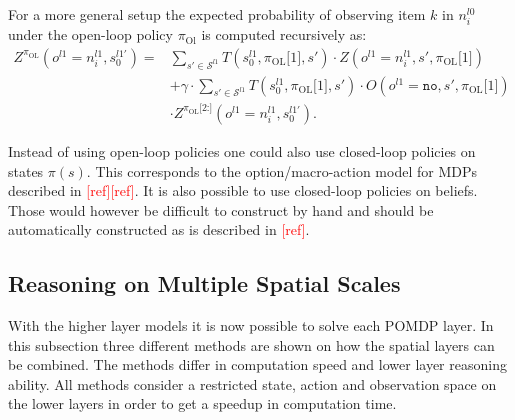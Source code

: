 For a more general setup the expected probability of observing item $k$ in $n_i^{l0}$ under the open-loop policy $\pi_\text{Ol}$ is computed recursively as:
\begin{equation}
    \begin{aligned}
        Z^{\pi_\text{OL}}\left( o^{l1}=n_i^{l1}, s_0^{l1\prime}\right) = &\sum_{s'\in\mathcal{S}^{l1}} T\left( s_0^{l1}, \pi_\text{OL}\texttt{[$1$]}, s' \right) \cdot Z\left(o^{l1}=n_i^{l1}, s', \pi_\text{OL}\texttt{[$1$]}\right) \\
        &+ \gamma \cdot \sum_{s'\in\mathcal{S}^{l1}} T\left( s_0^{l1}, \pi_\text{OL}\texttt{[$1$]}, s' \right) \cdot O\left( o^{l1}=\texttt{no}, s', \pi_\text{OL}\texttt{[$1$]} \right)\\
        &\cdot Z^{\pi_\text{OL}\texttt{[$2$:]}}\left( o^{l1}=n_i^{l1}, s_0^{l1'} \right).
    \end{aligned}
\end{equation}

Instead of using open-loop policies one could also use closed-loop policies on states $\pi(s)$. This corresponds to the option/macro-action model for MDPs described in \textcolor{red}{[ref][ref]}. It is also possible to use closed-loop policies on beliefs. Those would however be difficult to construct by hand and should be automatically constructed as is described in \textcolor{red}{[ref]}.


\subsection{Reasoning on Multiple Spatial Scales}\label{sec:M1toM3}
With the higher layer models it is now possible to solve each POMDP layer. In this subsection three different methods are shown on how the spatial layers can be combined. The methods differ in computation speed and lower layer reasoning ability. 
All methods consider a restricted state, action and observation space on the lower layers in order to get a speedup in computation time. 
%
